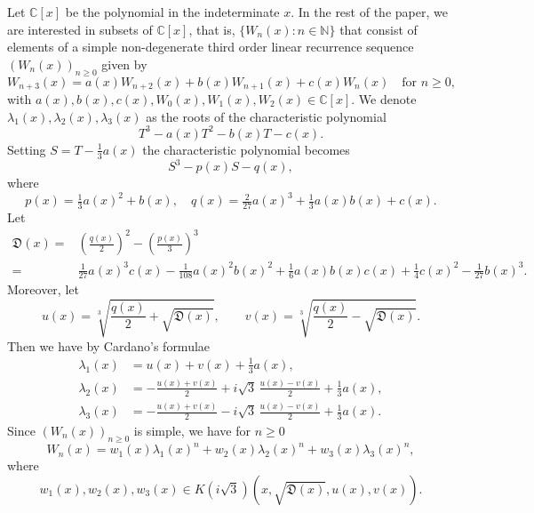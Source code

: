 \documentclass[12pt]{amsart}
\newcommand{\N}{\mbox{$\mathbb N$}}     %
\newcommand{\C}{\mbox{$\mathbb C$}}     %
\begin{document}
Let $\C[x]$ be the polynomial in the indeterminate $x$. In the rest of the paper, we are interested in subsets of $\C[x]$, that is, $\{W_n(x): n\in \N\}$ that consist of elements of a simple non-degenerate third order linear recurrence sequence $(W_n(x))_{n\geq 0}$ given by
\begin{equation}\label{recrel}
  W_{n+3}(x)=a(x)W_{n+2}(x)+b(x)W_{n+1}(x)+c(x)W_{n}(x)\quad \text{for } n\geq 0,  
\end{equation}
with $a(x),b(x),c(x),W_0(x),W_1(x),W_2(x)\in \C[x]$.
We denote $\lambda_1(x),\lambda_2(x),\lambda_3(x)$ as the roots of the characteristic polynomial 
\[T^3-a(x)T^2-b(x)T-c(x).\] Setting $S=T-\frac{1}{3}a(x)$ the characteristic polynomial becomes \[S^3-p(x)S-q(x),\] where
\[
p(x)=\tfrac{1}{3}a(x)^2+b(x), \quad 
q(x)=\tfrac{2}{27}a(x)^3+\tfrac{1}{3}a(x)b(x)+c(x).
\]
Let
\begin{align*}
    \mathfrak{D}(x) =& \left( \frac{q(x)}{2} \right)^2 - \left( \frac{p(x)}{3} \right)^3\\
      =& \tfrac{1}{27}a(x)^3c(x)-\tfrac{1}{108}a(x)^2b(x)^2+\tfrac{1}{6}a(x)b(x)c(x)+\tfrac{1}{4}c(x)^2-\tfrac{1}{27}b(x)^3.
\end{align*}
Moreover, let
\[
u(x)=\sqrt[3]{\frac{q(x)}{2}+\sqrt{\mathfrak{D}(x)}}, \qquad 
v(x)=\sqrt[3]{\frac{q(x)}{2}-\sqrt{\mathfrak{D}(x)}}.
\]
Then we have by Cardano’s formulae
\begin{align}
\lambda_1(x) &= u(x)+v(x)+\tfrac{1}{3}a(x), \label{eqt2.6} \\
\lambda_2(x) &= -\frac{u(x)+v(x)}{2}+ i\sqrt{3}\,\frac{u(x)-v(x)}{2}+\tfrac{1}{3}a(x), \label{eqt2.7}\\
\lambda_3(x) &= -\frac{u(x)+v(x)}{2}- i\sqrt{3}\,\frac{u(x)-v(x)}{2}+\tfrac{1}{3}a(x). \label{eqt2.8}
\end{align}
Since $(W_n(x))_{n\geq 0}$ is simple, we have for $n\geq 0$
\begin{equation}\label{eeq1}
W_n(x)=w_1(x)\lambda_1(x)^n+w_2(x)\lambda_2(x)^n+w_3(x)\lambda_3(x)^n,  
\end{equation}
where
\[
w_1(x),w_2(x),w_3(x)\in K(i\sqrt{3})\left( x,\sqrt{\mathfrak{D}(x)},u(x),v(x)\right).
\] 
\end{document}
